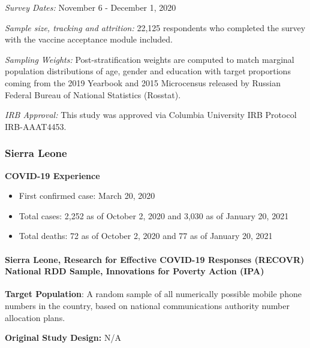 \documentclass[
  12pt,
]{article}
\begin{document}
\emph{Survey Dates:} November 6 - December 1, 2020

\emph{Sample size, tracking and attrition:} 22,125 respondents who completed the survey with the vaccine acceptance module included.

\emph{Sampling Weights:} Post-stratification weights are computed to match marginal population distributions of age, gender and education with target proportions coming from the 2019 Yearbook and 2015 Microcensus released by Russian Federal Bureau of National Statistics (Rosstat).

\emph{IRB Approval:} This study was approved via Columbia University IRB Protocol IRB-AAAT4453.

\hypertarget{sierra-leone}{%
\subsubsection*{Sierra Leone}\label{sierra-leone}}

\textbf{COVID-19 Experience}

\begin{itemize}
        \item First confirmed case: March 20, 2020
        \item Total cases:  2,252 as of October 2, 2020 and 3,030 as of January 20, 2021 
        \item Total deaths:  72 as of October 2, 2020 and 77 as of January 20, 2021 
\end{itemize}

\hypertarget{sierra-leone-research-for-effective-covid-19-responses-recovr-national-rdd-sample-innovations-for-poverty-action-ipa}{%
\paragraph*{Sierra Leone, Research for Effective COVID-19 Responses (RECOVR) National RDD Sample, Innovations for Poverty Action (IPA)}\label{sierra-leone-research-for-effective-covid-19-responses-recovr-national-rdd-sample-innovations-for-poverty-action-ipa}}

\textbf{Target Population}: A random sample of all numerically possible mobile phone numbers in the country, based on national communications authority number allocation plans.

\textbf{Original Study Design:} N/A
\end{document}
